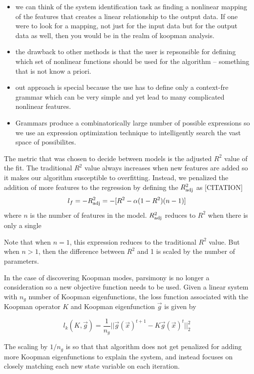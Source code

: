 \documentclass{article}
\begin{document}
\begin{itemize}
\item we can think of the system identification task as finding a nonlinear mapping of the features that creates a linear relationship to the output data. If one were to look for a mapping, not just for the input data but for the output data as well, then you would be in the realm of koopman analysis.
\item the drawback to other methods is that the user is repsonsible for defining which set of nonlinear functions should be used for the algorithm -- something that is not know a priori.
\item out approach is special because the use has to define only a context-fre grammar which can be very simple and yet lead to many complicated nonlinear features.
\item Grammars produce a combinatorically large number of possible expressions so we use an expression optimization technique to intelligently search the vast space of possibilites.
\end{itemize}

The metric that was chosen to decide between models is the adjusted $R^2$ value of the fit. The traditional $R^2$ value always increases when new features are added so it makes our algorithm susceptible to overfitting. Instead, we penalized the addition of more features to the regression by defining the $R_{\rm adj}^2$ as [CITATION]
\[ l_f = -R_{\rm adj}^2 = -[R^2 - \alpha (1-  R^2)(n-1)]\]
where $n$ is the number of features in the model. $R_{\rm adj}^2$ reduces to $R^2$ when there is only a single

Note that when $n=1$, this expression reduces to the traditional $R^2$ value. But when $n>1$, then the difference between $R^2$ and 1 is scaled by the number of parameters.

In the case of discovering Koopman modes, parsimony is no longer a consideration so a new objective function needs to be used. Given a linear system with $n_g$ number of Koopman eigenfunctions, the loss function associated with the Koopman operator $K$ and Koopman eigenfunction $\vec{g}$ is given by

\[ l_k(K, \vec{g}) = \frac{1}{n_g}||\vec{g}(\vec{x})^{t+1} - K \vec{g}(\vec{x})^{t}||_2^2 \]

The scaling by $1/n_g$ is so that that algorithm does not get penalized for adding more Koopman eigenfunctions to explain the system, and instead focuses on closely matching each new state variable on each iteration.
\end{document}
